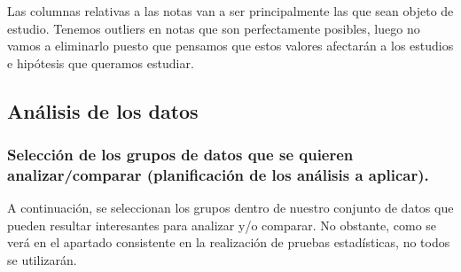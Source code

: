 \documentclass[]{article}
\begin{document}
Las columnas relativas a las notas van a ser principalmente las que sean
objeto de estudio. Tenemos outliers en notas que son perfectamente
posibles, luego no vamos a eliminarlo puesto que pensamos que estos
valores afectarán a los estudios e hipótesis que queramos estudiar.

\hypertarget{analisis-de-los-datos}{%
\subsection{Análisis de los datos}\label{analisis-de-los-datos}}

\hypertarget{seleccion-de-los-grupos-de-datos-que-se-quieren-analizarcomparar-planificacion-de-los-analisis-a-aplicar.}{%
\subsubsection{Selección de los grupos de datos que se quieren
analizar/comparar (planificación de los análisis a
aplicar).}\label{seleccion-de-los-grupos-de-datos-que-se-quieren-analizarcomparar-planificacion-de-los-analisis-a-aplicar.}}

A continuación, se seleccionan los grupos dentro de nuestro conjunto de
datos que pueden resultar interesantes para analizar y/o comparar. No
obstante, como se verá en el apartado consistente en la realización de
pruebas estadísticas, no todos se utilizarán.
\end{document}
